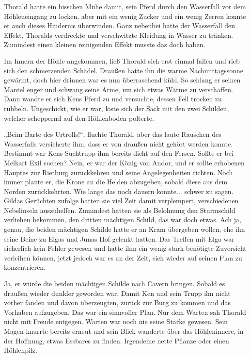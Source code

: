 \trennzeichen



Thorald hatte ein bisschen Mühe damit, sein Pferd durch den Wasserfall vor dem Höhleneingang zu locken, aber mit ein wenig Zucker und ein wenig Zerren konnte er auch dieses Hindernis überwinden. Ganz nebenbei hatte der Wasserfall den Effekt, Thoralds verdreckte und verschwitzte Kleidung in Wasser zu tränken. Zumindest einen kleinen reinigenden Effekt musste das doch haben.

Im Innern der Höhle angekommen, ließ Thorald sich erst einmal fallen und rieb sich den schmerzenden Schädel. Draußen hatte ihn die warme Nachmittagssonne gewärmt, doch hier drinnen war es nun überraschend kühl. So schlang er seinen Mantel enger und schwang seine Arme, um sich etwas Wärme zu verschaffen. Dann wandte er sich Kens Pferd zu und versuchte, dessen Fell trocken zu rubbeln. Ungeschickt, wie er war, löste sich der Sack mit den zwei Schilden, welcher scheppernd auf den Höhlenboden polterte.

„Beim Barte des Urtrolls!“, fluchte Thorald, aber das laute Rauschen des Wasserfalls versicherte ihm, dass er von draußen nicht gehört werden konnte. Bestimmt war Kens Suchtrupp ihm bereits dicht auf den Fersen. Sollte er bei Melkart Exil suchen? Nein, er war der König von Andor, und er sollte erhobenen Hauptes zur Rietburg zurückkehren und seine Angelegenheiten richten. Noch immer plante er, die Krone an die Helden abzugeben, sobald diese aus dem Norden zurückkehrten. Wie lange das noch dauern konnte... schwer zu sagen. Gildas Gerüchten zufolge hatten sie viel Zeit damit verplempert, verschiedenen Nebelinseln auszuhelfen. Zumindest hatten sie als Belohnung den Sturmschild verliehen bekommen, den dritten mächtigen Schild, das war doch etwas. Ach ja, genau, die beiden mächtigen Schilde hatte er an Kram übergeben wollen, ehe ihn seine Beine zu Elgas und Junas Hof gelenkt hatten. Das Treffen mit Elga war sicherlich kein Fehler gewesen und hatte ihm ein wenig stark benötigte Zuversicht verleihen können, jetzt jedoch war es an der Zeit, sich wieder auf seinen Plan zu konzentrieren.

Ja, er würde die beiden mächtigen Schilde nach Cavern bringen. Sobald es draußen wieder dunkler geworden war. Damit Ken und sein Trupp ihn nicht vorher fanden und davon überzeugten, zurück zur Burg zu kommen und das Vorhaben aufzugeben. Das war ein sinnvoller Plan. Nur dem Warten sah Thorald nicht mit Freude entgegen. Warten war noch nie seine Stärke gewesen. Sein Magen knurrte bereits erneut und sein Blick wanderte über das Höhleninnere, in der Hoffnung, etwas Essbares zu finden. Irgendeine nette Pflanze oder einen Höhlenpilz.

